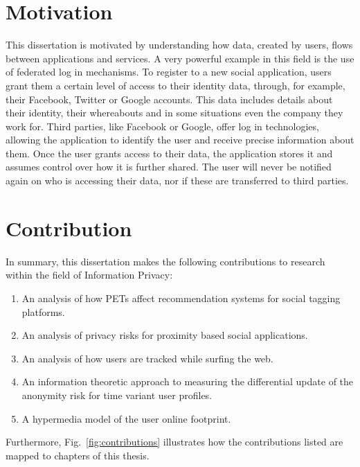 \section{Motivation}

This dissertation is motivated by understanding how data, created by users, flows between applications and services. A very powerful example in this field is the use of federated log in mechanisms. To register to a new social application, users grant them a certain level of access to their identity data, through, for example, their Facebook, Twitter or Google accounts. This data includes details about their identity, their whereabouts and in some situations even the company they work for. Third parties, like Facebook or Google, offer log in technologies, allowing the application to identify the user and receive precise information about them. Once the user grants access to their data, the application stores it and assumes control over how it is further shared. The user will never be notified again on who is accessing their data, nor if these are transferred to third parties. 

\section{Contribution}

In summary, this dissertation makes the following contributions to research within the field of Information Privacy:

\begin{enumerate}
    \item An analysis of how PETs affect recommendation systems for social tagging platforms.
    \item An analysis of privacy risks for proximity based social applications.
    \item An analysis of how users are tracked while surfing the web.
    \item An information theoretic approach to measuring the differential update of the anonymity risk for time variant user profiles.
    \item A hypermedia model of the user online footprint.
\end{enumerate}

Furthermore, Fig.~\ref{fig:contributions} illustrates how the contributions listed are mapped to chapters of this thesis.


